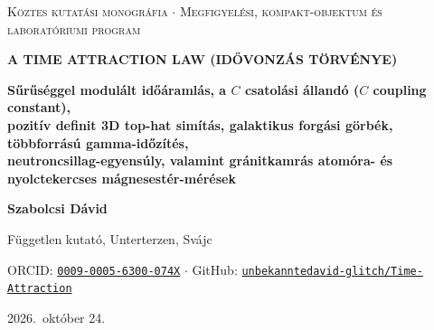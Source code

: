 \documentclass[10pt,a4paper]{article}
\begin{document}
\thispagestyle{empty}
\vspace*{1mm}
\noindent{\color{navy}\rule{\linewidth}{2pt}}\par\vspace{1.5mm}
\begin{center}
  {\footnotesize\scshape\color{slate}K\"oztes kutat\'asi monogr\'afia $\cdot$ Megfigyel\'esi, kompakt-objektum \'es laborat\'oriumi program}\par\vspace{1.5mm}
  {\LARGE\bfseries\color{navy}A TIME ATTRACTION LAW (ID\H{O}VONZ\'AS T\"ORV\'ENYE)}\par\vspace{2mm}
  {\large\bfseries\color{slate}S\H{u}r\H{u}s\'eggel modul\'alt id\H{o}\'araml\'as, a $C$ csatol\'asi \'alland\'o ($C$ coupling constant),}\\
  {\large\bfseries\color{slate}pozit\'iv definit 3D top-hat sim\'it\'as, galaktikus forg\'asi g\"orb\'ek, t\"obbforr\'as\'u gamma-id\H{o}z\'it\'es,}\\
  {\large\bfseries\color{slate}neutroncsillag-egyens\'uly, valamint gr\'anitkamr\'as atom\'ora- \'es nyolctekercses m\'agnesest\'er-m\'er\'esek}\par\vspace{2mm}
  {\normalsize\bfseries Szabolcsi D\'avid}\par\vspace{1mm}
  {\small F\"uggetlen kutat\'o, Unterterzen, Sv\'ajc}\par
  {\small ORCID: \href{https://orcid.org/0009-0005-6300-074X}{\texttt{0009-0005-6300-074X}} $\cdot$ GitHub: \href{https://github.com/unbekanntedavid-glitch/Time-Attraction}{\texttt{unbekanntedavid-glitch/Time-Attraction}}}\par
  {\small 2026.\ okt\'ober 24.}
\end{center}
\vspace{1.5mm}
\noindent{\color{navy}\rule{\linewidth}{0.8pt}}\par\vspace{2mm}
\end{document}
